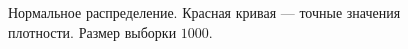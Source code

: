 \documentclass[12pt, a4paper]{article}
\begin{document}
\begin{figure}[H]
\caption{Нормальное распределение. Красная кривая --- точные значения плотности. Размер выборки $1000$.}
\end{figure}
\end{document}
